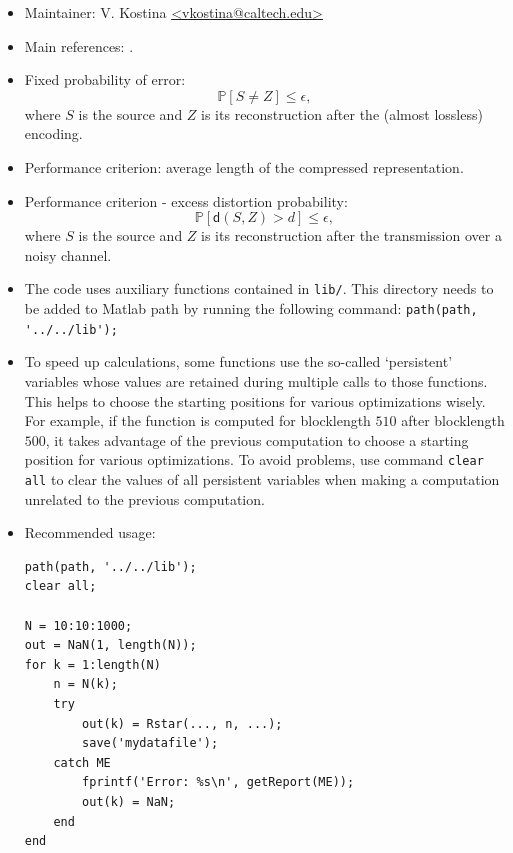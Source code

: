 \documentclass[a4paper,11p]{memoir}
\def\PP{\mathbb{P}}
\begin{document}
\begin{itemize}
\item Maintainer: V. Kostina \url{<vkostina@caltech.edu>}

\item Main references: \cite{kostina2015varrate}.


\item Fixed probability of error: $$ \PP[ S \neq Z ] \leq \epsilon,$$
where $S$ is the source and $Z$ is its reconstruction after the (almost lossless) encoding.

\item Performance criterion: average length of the compressed representation.   

\item Performance criterion - excess distortion probability: $$ \PP[ \mathsf d(S, Z) > d] \leq \epsilon,$$
where $S$ is the source and $Z$ is its reconstruction after the transmission over a noisy channel. 
\item The code uses auxiliary functions contained in \verb|lib/|. This directory needs to be added to Matlab path by running the following command: \verb|path(path, '../../lib');|

\item To speed up calculations, some functions use the so-called `persistent' variables whose values are retained during multiple calls to those functions. This helps to choose the starting positions for various optimizations wisely. For example, if the function is computed for blocklength $510$ after blocklength $500$, it takes advantage of the previous computation to choose a starting position for various optimizations. To avoid problems, use command \verb|clear all| to clear the values of all persistent variables when making a computation unrelated to the previous computation.    


\item Recommended usage: 
\begin{verbatim}
path(path, '../../lib');
clear all; 

N = 10:10:1000;
out = NaN(1, length(N));
for k = 1:length(N)
    n = N(k);  
    try
        out(k) = Rstar(..., n, ...);  
        save('mydatafile');  
    catch ME
        fprintf('Error: %s\n', getReport(ME));
        out(k) = NaN;
    end    
end
\end{verbatim}


\end{itemize}
\end{document}
